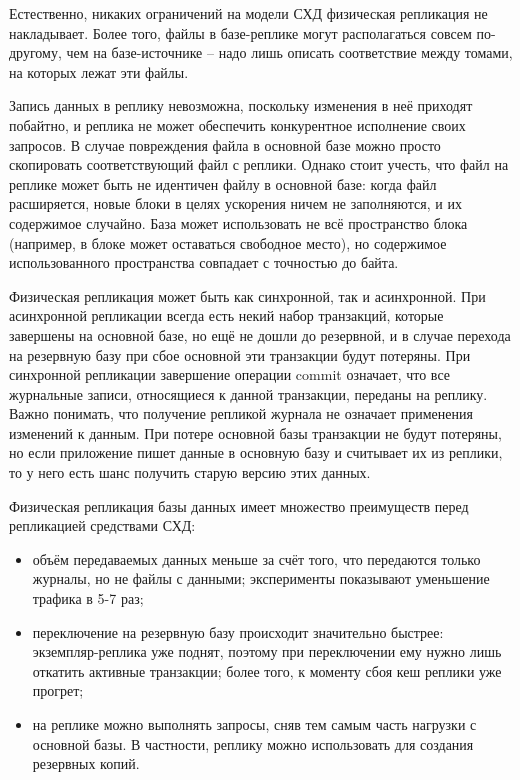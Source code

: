 Естественно, никаких ограничений на модели СХД физическая репликация не накладывает. Более того, файлы в базе-реплике
могут располагаться совсем по-другому, чем на базе-источнике – надо лишь описать соответствие между томами, на которых
лежат эти файлы.

Запись данных в реплику невозможна, поскольку изменения в неё приходят побайтно, и реплика не может обеспечить
конкурентное исполнение своих запросов. В случае повреждения файла в основной базе можно просто скопировать
соответствующий файл с реплики. Однако стоит учесть, что файл на реплике может быть не идентичен файлу в основной базе:
когда файл расширяется, новые блоки в целях ускорения ничем не заполняются, и их содержимое случайно. База может
использовать не всё пространство блока (например, в блоке может оставаться свободное место), но содержимое
использованного пространства совпадает с точностью до байта.

Физическая репликация может быть как синхронной, так и асинхронной. При асинхронной репликации всегда есть некий набор
транзакций, которые завершены на основной базе, но ещё не дошли до резервной, и в случае перехода на резервную базу при
сбое основной эти транзакции будут потеряны. При синхронной репликации завершение операции commit означает, что все
журнальные записи, относящиеся к данной транзакции, переданы на реплику. Важно понимать, что получение репликой журнала
не означает применения изменений к данным. При потере основной базы транзакции не будут потеряны, но если приложение
пишет данные в основную базу и считывает их из реплики, то у него есть шанс получить старую версию этих данных.

Физическая репликация базы данных имеет множество преимуществ перед репликацией средствами СХД:
\begin{itemize}
    \item объём передаваемых данных меньше за счёт того, что передаются только журналы, но не файлы с данными; эксперименты показывают уменьшение трафика в 5-7 раз;
    \item переключение на резервную базу происходит значительно быстрее: экземпляр-реплика уже поднят, поэтому при переключении ему нужно лишь откатить активные транзакции; более того, к моменту сбоя кеш реплики уже прогрет;
    \item на реплике можно выполнять запросы, сняв тем самым часть нагрузки с основной базы. В частности, реплику можно использовать для создания резервных копий.
\end{itemize}

